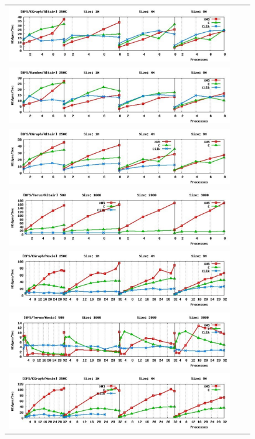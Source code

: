 \begin{figure}
\begin{center}
 \begin{tabular}{ccc}
\includegraphics[width=10cm]{new/bfs_kgraph_altair_color.pdf} \\
\includegraphics[width=10cm] {new/bfs_random_altair_color.pdf} \\
\includegraphics[width=10cm]{new/dfs_kgraph_altair_color.pdf}\\
\includegraphics[width=10cm]{new/dfs_torus_altair_color.pdf}\\
\includegraphics[width=10cm]{new/bfs_kgraph_moxie_color.pdf} \\
\includegraphics[width=10cm]{new/bfs_torus_moxie_color.pdf} \\
\includegraphics[width=10cm]{new/dfs_kgraph_moxie_color.pdf}\\

\end{tabular}
\end{center}
\end{figure}
